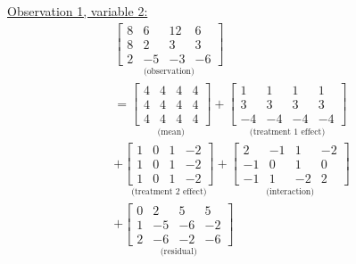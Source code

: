 \begin{enumerate}[label= (\alph*)]
    \underline{Observation 1, variable 2:}
    \begin{multline*}
        \underset{\text{(observation)}}{
            \left[
                \begin{array}{rrrr}
                    8 &  6 & 12 &  6 \\
                    8 &  2 &  3 &  3 \\
                    2 & -5 & -3 & -6
                \end{array}
            \right]
        }
        \\
        =
        \underset{\text{(mean)}}{
            \left[
                \begin{array}{rrrr}
                    4 & 4 & 4 & 4 \\
                    4 & 4 & 4 & 4 \\
                    4 & 4 & 4 & 4
                \end{array}
            \right]
        }
        +
        \underset{\text{(treatment 1 effect)}}{
            \left[
                \begin{array}{rrrr}
                     1 &  1 &  1 &  1 \\
                     3 &  3 &  3 &  3 \\
                    -4 & -4 & -4 & -4
                \end{array}
            \right]
        }
        \\
        +
        \underset{\text{(treatment 2 effect)}}{
            \left[
                \begin{array}{rrrr}
                    1 &  0 & 1 & -2 \\
                    1 &  0 & 1 & -2 \\
                    1 &  0 & 1 & -2
                \end{array}
            \right]
        }
        +
        \underset{\text{(interaction)}}{
            \left[
                \begin{array}{rrrr}
                     2 & -1 &  1 & -2 \\
                    -1 &  0 &  1 &  0 \\
                    -1 &  1 & -2 &  2
                \end{array}
            \right]
        }
        \\
        +
        \underset{\text{(residual)}}{
            \left[
                \begin{array}{rrrr}
                     0 &  2 &  5 &  5 \\
                     1 & -5 & -6 & -2 \\
                     2 & -6 & -2 & -6
                \end{array}
            \right]
        }
    \end{multline*}


\end{enumerate}
